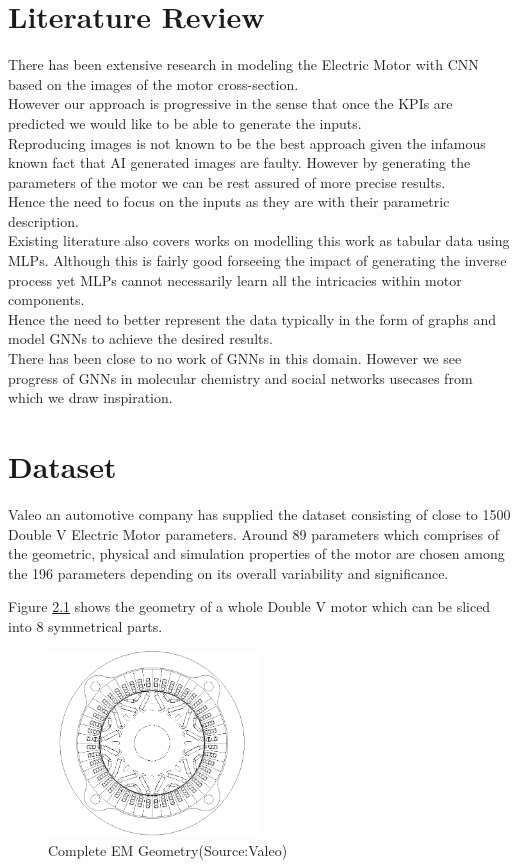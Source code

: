 \documentclass{report} %
\begin{document}
\chapter{Literature Review} 
There has been extensive research in modeling the Electric Motor with \ac{CNN} based on the images of the motor cross-section. \\
However our approach is progressive in the sense that once the \ac{KPI}s are predicted we would like to be able to generate the inputs.\\
Reproducing images is not known to be the best approach given the infamous known fact that AI generated images are faulty. However by generating the parameters of the motor we can be rest assured of more precise results. \\
Hence the need to focus on the inputs as they are with their parametric description.\\
Existing literature also covers works on modelling this work as tabular data using \ac{MLP}s. 
Although this is fairly good forseeing the impact of generating the inverse process yet \ac{MLP}s cannot necessarily learn all the intricacies within motor components. \\
Hence the need to better represent the data typically in the form of graphs and model \ac{GNN}s to achieve the desired results. \\
There has been close to no work of \ac{GNN}s in this domain. However we see progress of \ac{GNN}s in molecular chemistry and social networks usecases from which we draw inspiration.\\

\newpage 

\chapter{Dataset} 
Valeo an automotive company has supplied the dataset consisting of close to 1500 Double V Electric Motor parameters. 
Around 89 parameters which comprises of the geometric, physical and simulation properties of the motor are chosen among the 196 parameters depending on its overall variability and significance.

Figure \ref{fig:Full Motor} shows the geometry of a whole Double V motor which can be sliced into 8 symmetrical parts.

\begin{figure}[H]
    \centering
    \includegraphics[width=0.5\textwidth]{./ReportImages/FullMotorv2.png} 
    \caption{Complete EM Geometry(Source:Valeo)}
    \label{fig:Full Motor}
\end{figure}
\end{document}
